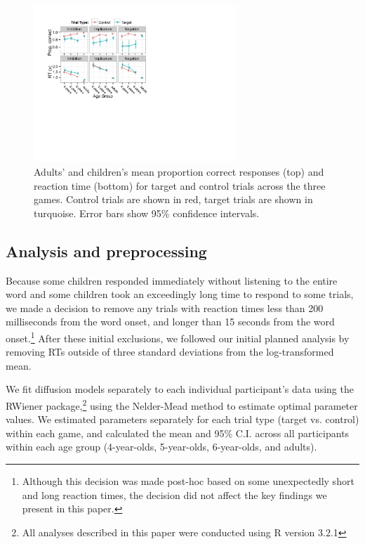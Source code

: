 \documentclass[10pt,letterpaper]{article}
\begin{document}
\begin{figure}
\begin{center}
\includegraphics[width=3in]{figures/correct_RT.pdf}
\caption{\label{fig:traditional} Adults' and children's mean proportion correct responses (top) and reaction time (bottom) for target and control trials across the three games. Control trials are shown in red, target trials are shown in turquoise. Error bars show 95\% confidence intervals. }
\end{center}
\end{figure}

\subsection{Analysis and preprocessing}

Because some children responded immediately without listening to the entire word and some children took an exceedingly long time to respond to some trials, we made a decision to remove any trials with reaction times less than 200 milliseconds from the word onset, and longer than 15 seconds from the word onset.\footnote{Although this decision was made post-hoc based on some unexpectedly short and long reaction times, the decision did not affect the key findings we present in this paper.} After these initial exclusions, we followed our initial planned analysis by removing RTs outside of three standard deviations from the log-transformed mean.

We fit diffusion models separately to each individual participant's data using the RWiener package,\footnote{All analyses described in this paper were conducted using R version 3.2.1} using the Nelder-Mead method to estimate optimal parameter values. We estimated parameters separately for each trial type (target vs. control) within each game, and calculated the mean and 95\% C.I. across all participants within each age group (4-year-olds, 5-year-olds, 6-year-olds, and adults).
\end{document}
